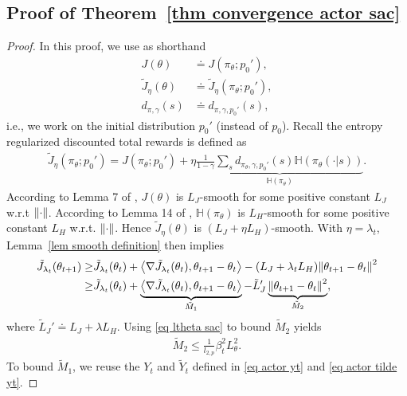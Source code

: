\documentclass[twoside,11pt]{article}
\newcommand{\mH}{\mathbb{H}}
\newcommand{\indot}[2]{{\left<#1, #2\right>}}
\newcommand{\ent}[1]{\mathbb{H}\left(#1\right)}
\numberwithin{assucounter}{section}
\begin{document}
\subsection{Proof of Theorem~\ref{thm convergence actor sac}}
\thmconvergenceactorsac*
\label{sec proof thm convergence actor sac}
\begin{proof}
  In this proof,
  we use as shorthand
  \begin{align}
    \label{eq actor convergence shorthard sac}
    J(\theta) &\doteq J(\pi_\theta; p_0'), \\
    \tilde J_\eta(\theta) &\doteq \tilde J_\eta(\pi_\theta; p_0'), \\
    d_{\pi, \gamma}(s) &\doteq d_{\pi, \gamma, p_0'}(s),
  \end{align}
  i.e.,
  we work on the initial distribution $p_0'$ (instead of $p_0$).
  Recall the entropy regularized discounted total rewards is defined as 
  \begin{align}
    \tilde J_\eta(\pi_\theta;p_0') = J(\pi_\theta;p_0') + \eta \underbrace{\frac{1}{1-\gamma} \sum_{s} d_{\pi_\theta, \gamma, p_0'}(s) \ent{\pi_\theta(\cdot | s)}}_{\mH(\pi_\theta)}.
  \end{align}
  According to Lemma 7 of \citet{mei2020global}, $J(\theta)$ is $L_J$-smooth for some positive constant $L_J$ w.r.t $\norm{\cdot}$.
  According to Lemma 14 of \citet{mei2020global}, $\mH(\pi_\theta)$ is $L_H$-smooth for some positive constant $L_H$ w.r.t. $\norm{\cdot}$.
  Hence $\tilde J_\eta(\theta)$ is $(L_J + \eta L_H)$-smooth.
  With $\eta = \lambda_t$,
  Lemma~\ref{lem smooth definition} then implies
  \begin{align}
    \tilde J_{\lambda_t}(\theta_{t+1}) \geq& \tilde J_{\lambda_t}(\theta_t) + \indot{\nabla \tilde J_{\lambda_t}(\theta_t)}{\theta_{t+1} - \theta_t} - (L_J + \lambda_t L_H) \norm{\theta_{t+1}-\theta_t}^2 \\
    \geq& \tilde J_{\lambda_t}(\theta_t) + \underbrace{\indot{\nabla \tilde J_{\lambda_t}(\theta_t)}{\theta_{t+1} - \theta_t}}_{\tilde M_1} - \tilde L_J' \underbrace{\norm{\theta_{t+1}-\theta_t}^2}_{\tilde M_2},
  \end{align}
  where $\tilde L_J' \doteq L_J + \lambda L_H$.
  Using \eqref{eq ltheta sac} to bound $\tilde M_2$ yields
  \begin{align}
    \tilde M_2 \leq \frac{1}{l_{2,p}} \beta_t^2 L_\theta^2.
  \end{align}
  To bound $\tilde M_1$, 
  we reuse the $Y_t$ and $\tilde Y_t$ defined in \eqref{eq actor yt} and \eqref{eq actor tilde yt}.

\end{proof}
\end{document}
